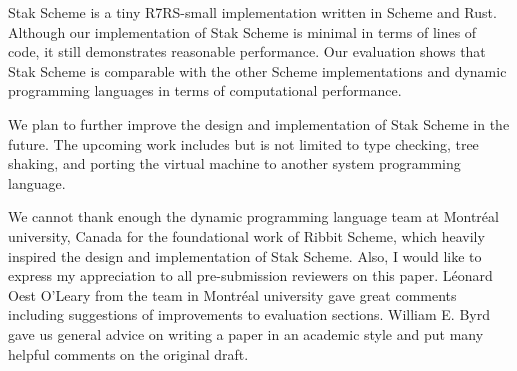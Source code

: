\documentclass[sigplan, anonymous, review]{acmart}
\begin{document}
Stak Scheme is a tiny R7RS-small implementation written in Scheme and
Rust.
Although our implementation of Stak Scheme is minimal in terms of
lines of code, it still demonstrates reasonable performance.
Our evaluation shows that Stak Scheme is
comparable with the other Scheme implementations and dynamic
programming languages in terms of computational performance.

We plan to further improve the design and implementation of Stak
Scheme in the future. The upcoming work includes but is not limited
to type checking, tree shaking, and porting the virtual machine to
another system programming language.

\begin{acks}
  We cannot thank enough the dynamic programming language team at
  Montréal university, Canada for the foundational work of Ribbit
  Scheme, which heavily inspired the design and implementation of
  Stak Scheme.
  Also, I would like to express my appreciation to all pre-submission
  reviewers on this paper.
  Léonard Oest O'Leary from the team in Montréal university gave
  great comments including
  suggestions of improvements to evaluation sections.
  William E. Byrd gave us general advice on writing a paper in an
  academic style and put many helpful comments on the original draft.
\end{acks}



\end{document}
